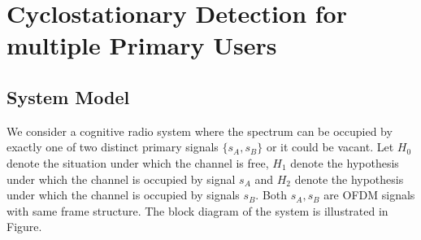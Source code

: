 \section{Cyclostationary Detection for multiple Primary Users}
\subsection{System Model}

We consider a cognitive radio system where the spectrum can be occupied by exactly one of two distinct primary signals $\{s_A, s_B\}$ or it could be vacant. Let $H_0$ denote the situation under which the channel is free, $H_1$ denote the hypothesis under which the channel is occupied by signal $s_A$ and $H_2$ denote the hypothesis under which the channel is occupied by signals $s_B$. Both $s_A, s_B$ are OFDM signals with same frame structure. The block diagram of the system is illustrated in Figure.

